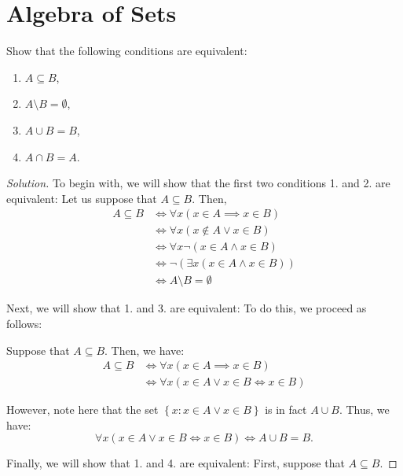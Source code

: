 \documentclass{article}
\newenvironment{solution}{\begin{proof}[Solution]}{\end{proof}}
\renewcommand\qedsymbol{$\blacksquare$}
\newenvironment{innerproof}{\renewcommand{\qedsymbol}{$\square$}\proof}{\endproof}
\newcommand{\pr}[1]{\left( {#1} \right)}
\newcommand{\brc}[1]{ \left\{  {#1} \right\}}
\begin{document}
\section{Algebra of Sets}
\begin{hw}[Problem 2.17]
	Show that the following conditions are equivalent:
	\begin{enumerate}
		\item $A \subseteq B$,
		\item $A \setminus B = \emptyset$,
		\item $A \cup B = B$,
		\item $A \cap B = A$.
	\end{enumerate}
\end{hw}
\begin{solution}
	To begin with, we will show that the first two conditions 1. and 2. are equivalent:
	\begin{innerproof}
		Let us suppose that $A \subseteq B$. Then,
		\begin{align*}
			A \subseteq B &\iff \forall x \pr{x \in A \implies x \in B} \\
			&\iff \forall x \pr{x \not\in A \lor x \in B} \\
			&\iff \forall x\neg\pr{x \in A \land x \in B} \\
			&\iff \neg\pr{\exists x\pr{x \in A \land x \in B}} \\
			&\iff A \setminus B = \emptyset
		\end{align*}
	\end{innerproof}

	Next, we will show that 1. and 3. are equivalent:
	\begin{innerproof}
		To do this, we proceed as follows:
		
		Suppose that $A \subseteq B$. Then, we have:
		\begin{align*}
			A \subseteq B &\iff \forall x\pr{x \in A \implies x \in B} \\
			&\iff \forall x\pr{x \in A \lor x \in B \iff x \in B}
		\end{align*}
	
		However, note here that the set $\brc{x : x \in A \lor x \in B}$ is in fact $A \cup B$. Thus, we have:
		\begin{equation*}
			\forall x \pr{x \in A \lor x \in B \iff x \in B} \iff A \cup B = B.
		\end{equation*}
	\end{innerproof}

	Finally, we will show that 1. and 4. are equivalent:
	\begin{innerproof}
		First, suppose that $A \subseteq B$.
		

\end{innerproof}
\end{solution}
\end{document}
